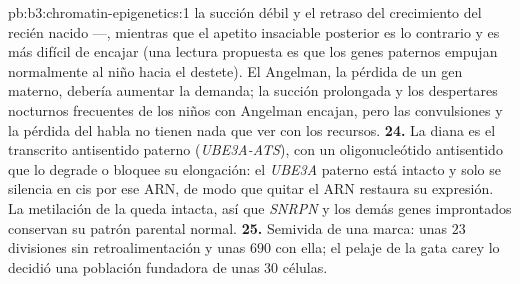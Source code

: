 \begin{solution}{pb:b3:chromatin-epigenetics:1}
la succión débil y el retraso del crecimiento del recién nacido ---,
mientras que el apetito insaciable posterior es lo contrario y es más
difícil de encajar (una lectura propuesta es que los genes paternos
empujan normalmente al niño hacia el destete). El Angelman, la pérdida de
un gen materno, debería aumentar la demanda; la succión prolongada y los
despertares nocturnos frecuentes de los niños con Angelman encajan, pero
las convulsiones y la pérdida del habla no tienen nada que ver con los
recursos.
\textbf{24.} La diana es el transcrito antisentido paterno
(\emph{UBE3A-ATS}), con un oligonucleótido antisentido que lo degrade o
bloquee su elongación: el \emph{UBE3A} paterno está intacto y solo se
silencia en cis por ese ARN, de modo que quitar el ARN restaura su
expresión. La metilación de la  queda
intacta, así que \emph{SNRPN} y los demás genes improntados conservan su
patrón parental normal.
\textbf{25.} Semivida de una marca: unas $23$ divisiones sin
retroalimentación y unas $690$ con ella; el pelaje de la gata carey lo
decidió una población fundadora de unas $30$ células.
\end{solution}
